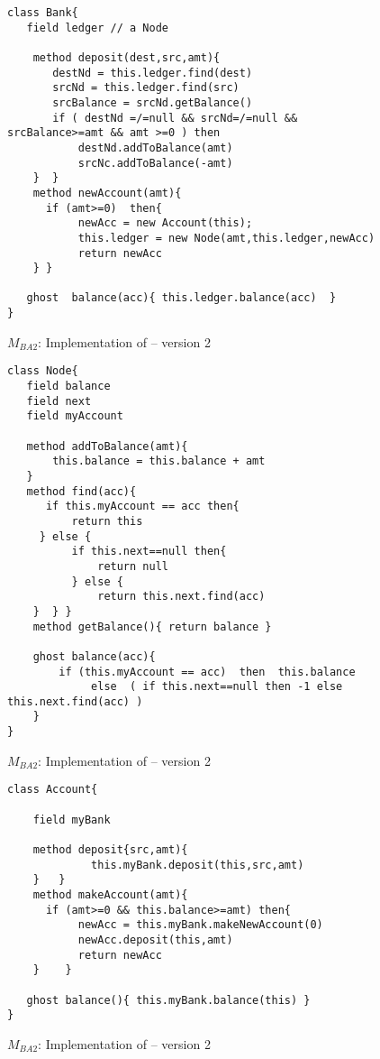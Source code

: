 \begin{figure}[htb]
\begin{lstlisting}
class Bank{
   field ledger // a Node
   
    method deposit(dest,src,amt){
       destNd = this.ledger.find(dest)
       srcNd = this.ledger.find(src)
       srcBalance = srcNd.getBalance()
       if ( destNd =/=null && srcNd=/=null && srcBalance>=amt && amt >=0 ) then
           destNd.addToBalance(amt)
           srcNc.addToBalance(-amt)           
    }  }     
    method newAccount(amt){
      if (amt>=0)  then{
           newAcc = new Account(this);
           this.ledger = new Node(amt,this.ledger,newAcc)
           return newAcc 
    } }
   
   ghost  balance(acc){ this.ledger.balance(acc)  } 
}
\end{lstlisting}
 \vspace*{-7mm}
\caption{$M_{BA2}$: Implementation of    -- version 2}
\label{fig:BanAccImplV2a}
\end{figure}

 
\begin{figure}[htb]
\begin{lstlisting}
class Node{
   field balance
   field next   
   field myAccount
   
   method addToBalance(amt){
       this.balance = this.balance + amt
   }   
   method find(acc){
      if this.myAccount == acc then{
          return this
     } else { 
          if this.next==null then{
              return null
          } else {
              return this.next.find(acc)
    }  } } 
    method getBalance(){ return balance }
    
    ghost balance(acc){
        if (this.myAccount == acc)  then  this.balance
             else  ( if this.next==null then -1 else this.next.find(acc) )
    }
}          
\end{lstlisting}
 \vspace*{-7mm}
\caption{$M_{BA2}$: Implementation of    -- version 2}
\label{fig:BanAccImplV2a}
\end{figure}

\begin{figure}[htb]
\begin{lstlisting}
class Account{

    field myBank
    
    method deposit{src,amt){
             this.myBank.deposit(this,src,amt)
    }   }    
    method makeAccount(amt){
      if (amt>=0 && this.balance>=amt) then{
           newAcc = this.myBank.makeNewAccount(0)
           newAcc.deposit(this,amt)
           return newAcc
    }    }     

   ghost balance(){ this.myBank.balance(this) }   
}
\end{lstlisting}
 \vspace*{-7mm}
\caption{$M_{BA2}$: Implementation of   -- version 2}
\label{fig:BanAccImplV2b}
\end{figure}
 


